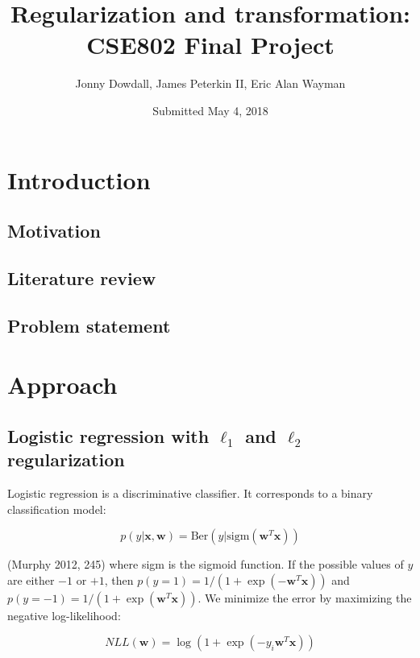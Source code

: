 \documentclass[letterpaper, 12pt]{article}
\newcommand{\vect}[1]{\boldsymbol{#1}}
\begin{document}
\renewcommand{\arraystretch}{1.1}

\title{Regularization and transformation:\\CSE802 Final Project}
\author{Jonny Dowdall, James Peterkin II, Eric Alan Wayman}
\date{Submitted May 4, 2018}
\maketitle

\section{Introduction}

\subsection{Motivation}

\subsection{Literature review}

\subsection{Problem statement}

\section{Approach}

\subsection{Logistic regression with $\ell_1$ and $\ell_2$ regularization}

Logistic regression is a discriminative classifier. It corresponds to a binary classification model:

\begin{equation*}
  p(y | \vect{x}, \vect{w}) = \text{Ber}(y | \text{sigm}(\vect{w}^T\vect{x}))
\end{equation*}

(Murphy 2012, 245) where sigm is the sigmoid function. If the possible values of $y$ are either $-1$ or $+1$, then $p(y = 1) = 1 / (1 + \exp(-\vect{w}^T\vect{x}))$ and $p(y = -1) = 1 / (1 + \exp(\vect{w}^T\vect{x}))$. We minimize the error by maximizing the negative log-likelihood:

\begin{equation*}
  NLL(\vect{w}) = \log(1 + \exp(-y_i \vect{w}^T\vect{x}))
\end{equation*}
\end{document}
